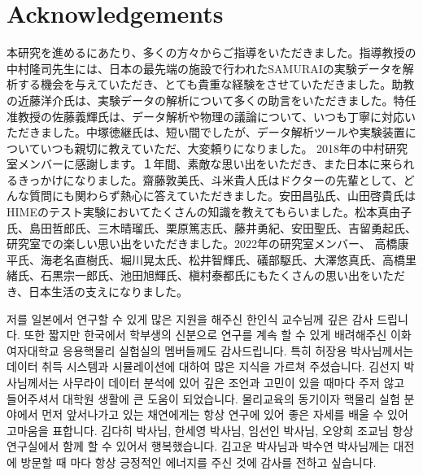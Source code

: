 \documentclass[11pt]{book}
\begin{document}
\tableofcontents
\listoffigures
\listoftables

\mainmatter %








\appendix
%



\backmatter



\chapter*{Acknowledgements}

\begin{japanese}
本研究を進めるにあたり、多くの方々からご指導をいただきました。指導教授の中村隆司先生には、日本の最先端の施設で行われたSAMURAIの実験データを解析する機会を与えていただき、とても貴重な経験をさせていただきました。助教の近藤洋介氏は、実験データの解析について多くの助言をいただきました。特任准教授の佐藤義輝氏は、データ解析や物理の議論について、いつも丁寧に対応いただきました。中塚徳継氏は、短い間でしたが、データ解析ツールや実験装置についていつも親切に教えていただ、大変頼りになりました。
2018年の中村研究室メンバーに感謝します。１年間、素敵な思い出をいただき、また日本に来られるきっかけになりました。齋藤敦美氏、斗米貴人氏はドクターの先輩として、どんな質問にも関わらず熱心に答えていただきました。安田昌弘氏、山田啓貴氏はHIMEのテスト実験においてたくさんの知識を教えてもらいました。松本真由子氏、島田哲郎氏、三木晴瑠氏、栗原篤志氏、藤井勇紀、安田聖氏、吉留勇起氏、研究室での楽しい思い出をいただきました。2022年の研究室メンバー、
高橋康平氏、海老名直樹氏、堀川晃太氏、松井智輝氏、礒部駆氏、大澤悠真氏、高橋里緒氏、石黒宗一郎氏、池田旭輝氏、槇村泰都氏にもたくさんの思い出をいただき、日本生活の支えになりました。
\end{japanese}

저를 일본에서 연구할 수 있게 많은 지원을 해주신 한인식 교수님께 깊은 감사 드립니다. 또한 짧지만 한국에서 학부생의 신분으로 연구를 계속 할 수 있게 배려해주신 이화여자대학교 응용핵물리 실험실의 멤버들께도 감사드립니다. 특히 허장용 박사님께서는 데이터 취득 시스템과 시뮬레이션에 대하여 많은 지식을 가르쳐 주셨습니다. 김선지 박사님께서는 사무라이 데이터 분석에 있어 깊은 조언과 고민이 있을 때마다 주저 않고 들어주셔서 대학원 생활에 큰 도움이 되었습니다. 물리교육의 동기이자 핵물리 실험 분야에서 먼저 앞서나가고 있는 채연에게는 항상 연구에 있어 좋은 자세를 배울 수 있어 고마움을 표합니다. 김다히 박사님, 한세영 박사님, 임선인 박사님, 오양희 조교님 항상 연구실에서 함께 할 수 있어서 행복했습니다. 김고운 박사님과 박수연 박사님께는 대전에 방문할 때 마다 항상 긍정적인 에너지를 주신 것에 감사를 전하고 싶습니다.
\end{document}
